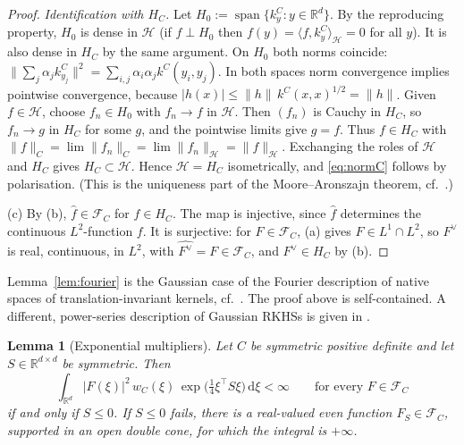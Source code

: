 \documentclass[11pt]{article}
\newtheorem{lemma}{Lemma}
\theoremstyle{definition}
\theoremstyle{remark}
\newcommand{\R}{\mathbb{R}}
\newcommand{\dd}{\,\mathrm{d}}
\newcommand{\FC}[1]{\mathcal{F}_{#1}}
\newcommand{\ip}[2]{\langle #1,#2\rangle}
\newcommand{\hatf}[1]{\widehat{#1}}
\newcommand{\tp}{\top}
\begin{document}
\begin{proof}
\emph{Identification with $H_C$.} Let $H_0:=\operatorname{span}\{k^C_y:y\in\R^d\}$. By the reproducing property, $H_0$
is dense in $\mathcal H$ (if $f\perp H_0$ then $f(y)=\ip f{k^C_y}_{\mathcal H}=0$ for all $y$). It is also dense
in $H_C$ by the same argument. On $H_0$ both norms coincide:
$\|\sum_j\alpha_jk^C_{y_j}\|^2=\sum_{i,j}\alpha_i\alpha_jk^C(y_i,y_j)$. In both spaces norm convergence implies
pointwise convergence, because $|h(x)|\le\|h\|\,k^C(x,x)^{1/2}=\|h\|$. Given $f\in\mathcal H$, choose $f_n\in H_0$
with $f_n\to f$ in $\mathcal H$. Then $(f_n)$ is Cauchy in $H_C$, so $f_n\to g$ in $H_C$ for some $g$, and the pointwise
limits give $g=f$. Thus $f\in H_C$ with $\|f\|_C=\lim\|f_n\|_C=\lim\|f_n\|_{\mathcal H}=\|f\|_{\mathcal H}$.
Exchanging the roles of $\mathcal H$ and $H_C$ gives $H_C\subset\mathcal H$. Hence $\mathcal H=H_C$ isometrically,
and \eqref{eq:normC} follows by polarisation. (This is the uniqueness part of the Moore--Aronszajn theorem,
cf.\ \cite{Aronszajn,PaulsenRaghupathi}.)

(c) By (b), $\hatf f\in\FC{C}$ for $f\in H_C$. The map is injective, since $\hatf f$ determines the continuous
$L^2$-function $f$. It is surjective: for $F\in\FC{C}$, (a) gives $F\in L^1\cap L^2$, so $F^\vee$ is real, continuous,
in $L^2$, with $\hatf{F^\vee}=F\in\FC{C}$, and $F^\vee\in H_C$ by (b).
\end{proof}

Lemma~\ref{lem:fourier} is the Gaussian case of the Fourier description of native spaces of
translation-invariant kernels, cf.\ \cite[Theorem~10.12]{Wendland}. The proof above is self-contained. A different,
power-series description of Gaussian RKHSs is given in \cite{SHS}.

\begin{lemma}[Exponential multipliers]\label{lem:multiplier}
Let $C$ be symmetric positive definite and let $S\in\R^{d\times d}$ be symmetric. Then
\[
\int_{\R^d}|F(\xi)|^2\,w_C(\xi)\,\exp\bigl(\tfrac14\xi^\tp S\xi\bigr)\dd\xi<\infty\qquad\text{for every }F\in\FC{C}
\]
if and only if $S\le0$. If $S\le 0$ fails, there is a real-valued even function $F_S\in\FC{C}$, supported in an open
double cone, for which the integral is $+\infty$.
\end{lemma}
\end{document}

